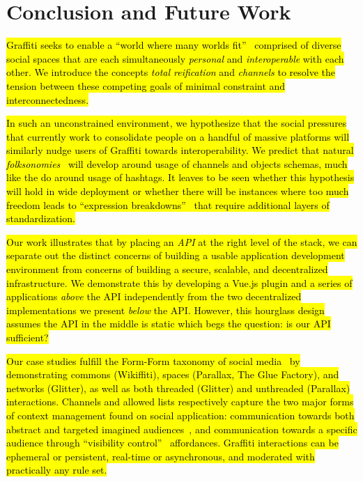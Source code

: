\section{Conclusion and Future Work}

{\hl{%
Graffiti seeks to enable a ``world where many worlds fit''~{\cite{escobarpluriverse}}
comprised of diverse social spaces that are each simultaneously \emph{personal}
and \emph{interoperable} with each other.
We introduce the concepts \emph{total reification} and \emph{channels}
to resolve the tension between these competing goals
of minimal constraint and interconnectedness.
}}%

{\hl{%
In such an unconstrained environment,
we hypothesize that the social pressures that currently work
to consolidate people on a handful of massive platforms
will similarly nudge users of Graffiti towards interoperability.
We predict that natural \emph{folksonomies}~{\cite{folksonomy}} will
develop around usage of channels and objects schemas, much like the do around usage of hashtags.
It leaves to be seen whether this hypothesis will hold in wide deployment
or whether there will be instances where too much freedom leads to
``expression breakdowns''~{\cite{expressionbreakdowns}}
that require additional layers of standardization.
}}%

{\hl{%
Our work illustrates that by placing an \emph{API}
at the right level of the stack, we can separate out the distinct concerns
of building a usable application development environment
from concerns of building a secure, scalable, and decentralized infrastructure.
We demonstrate this by developing a Vue.js plugin and a series
of applications \emph{above} the API independently from the
two decentralized implementations we present \emph{below} the API.
However, this hourglass design assumes the API in the middle is static
which begs the question: is our API sufficient?
}}%

{\hl{%
Our case studies fulfill the Form-Form taxonomy of social media~{\cite{formfrom}}
by demonstrating commons (Wikiffiti), spaces (Parallax, The Glue Factory), and networks (Glitter),
as well as both threaded (Glitter) and unthreaded (Parallax) interactions.
Channels and allowed lists respectively capture the two major
forms of context management found on social application:
communication towards both abstract and targeted imagined audiences~{\cite{imaginedaudience}},
and communication towards a specific audience through ``visibility control''~{\cite{visibilitycontrol}} affordances.
Graffiti interactions can be ephemeral or persistent, real-time or asynchronous,
and moderated with practically any rule set.
}}%

